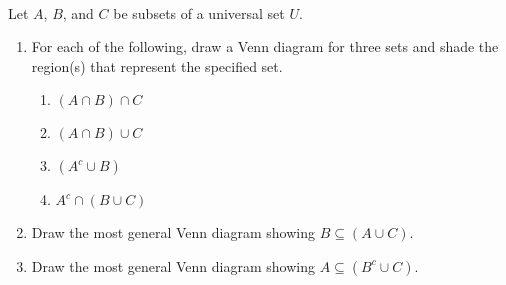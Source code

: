 \hbreak
\begin{prog} \label{prog:venndiagrams} \hfill \\
Let $A$, $B$, and $C$ be subsets of a universal set $U$.
\begin{enumerate}
  \item For each of the following, draw a Venn diagram for three sets and shade the region(s) that represent the specified set. 
  \begin{multicols}{2}
  \begin{enumerate}
   \item $(A \cap B) \cap C$
   \item $(A \cap B) \cup C$
   \item $\left( A^c \cup B \right)$
   \item $A^c \cap (B \cup C)$
  \end{enumerate}
  \end{multicols}
  \item Draw the most general Venn diagram showing $B \subseteq (A \cup C)$.
  \item Draw the most general Venn diagram showing $A \subseteq \left( B^c \cup C \right)$.
\end{enumerate}
\end{prog}
\hbreak



\endinput
 
